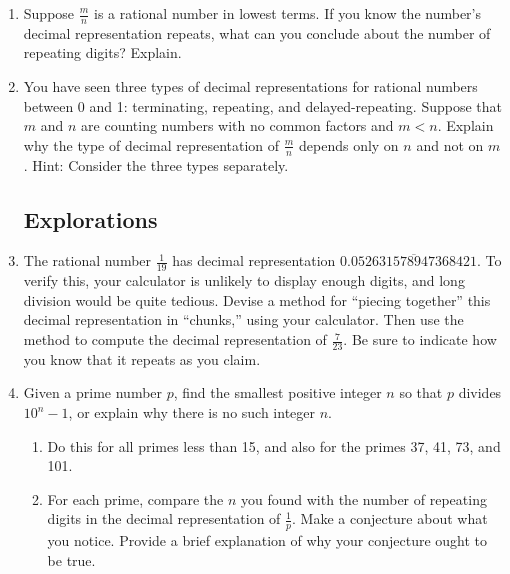 \begin{problems}
\begin{enumerate}
\item Suppose $\frac{m}{n}$ is a rational number in lowest terms.  If you know the number's decimal representation repeats, what can you conclude about the number of repeating digits?  Explain.  

\item You have seen three types of decimal representations for rational numbers between 0 and 1:  terminating, repeating, and delayed-repeating.  Suppose that $m$ and $n$ are counting numbers with no common factors and $m<n$.  Explain why the type of decimal representation of $\frac{m}{n}$ depends only on $n$ and not on $m$.  Hint:  Consider the three types separately.  

\subsection*{Explorations}

\item The rational number $\frac{1}{19}$ has decimal representation $0.\overline{052631578947368421}$.  To verify this, your calculator is unlikely to display enough digits, and long division would be quite tedious.  Devise a method for ``piecing together'' this decimal representation in ``chunks,'' using your calculator.  Then use the method to compute the decimal representation of $\frac{7}{23}$.  Be sure to indicate how you know that it repeats as you claim.  

\item Given a prime number $p$, find the smallest positive integer $n$ so that $p$ divides $10^n-1$, or explain why there is no such integer $n$.  
\begin{enumerate}
\item Do this for all primes less than 15, and also for the primes 37, 41, 73, and 101.
\item For each prime, compare the $n$ you found with the number of repeating digits in the decimal representation of $\frac{1}{p}$.  
Make a conjecture about what you notice.  Provide a brief explanation of why your conjecture ought to be true. 
\end{enumerate}



\end{enumerate}
\end{problems}
